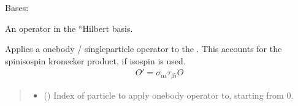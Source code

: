 \documentclass[letterpaper,10pt,english]{sphinxmanual}
\begin{document}

\begin{fulllineitems}
\label{\detokenize{spinbox:spinbox.core.HilbertOperator}}
\pysigstartsignatures
{}
\pysigstopsignatures
\sphinxAtStartPar
Bases: 

\sphinxAtStartPar
An operator in the “Hilbert basis.

\begin{fulllineitems}
\label{\detokenize{spinbox:spinbox.core.HilbertOperator.apply_onebody_operator}}
\pysigstartsignatures
{}
\pysigstopsignatures
\sphinxAtStartPar
Applies a one\sphinxhyphen{}body / single\sphinxhyphen{}particle operator to the .
This accounts for the spin\sphinxhyphen{}isospin kronecker product, if isospin is used.
\begin{equation*}
\begin{split}O' = \sigma_{\alpha i} \tau_{\beta i} O\end{split}
\end{equation*}\begin{quote}\begin{description}
\begin{itemize}
\item {} 
\sphinxAtStartPar
{} () \textendash{} Index of particle to apply onebody operator to, starting from 0.


\end{itemize}
\end{description}
\end{quote}
\end{fulllineitems}
\end{fulllineitems}
\end{document}
